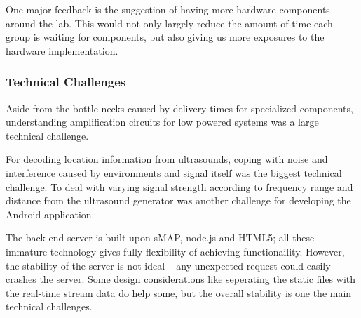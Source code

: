 One major feedback is the suggestion of having more hardware components around the lab. This would not only largely reduce the amount of time each group is waiting for components, but also giving us more exposures to the hardware implementation.

\subsubsection{Technical Challenges}
\label{sec:technical-challenges}
Aside from the bottle necks caused by delivery times for specialized components, understanding amplification circuits for low powered systems was a large technical challenge.

For decoding location information from ultrasounds, coping with noise and interference caused by environments and signal itself was the biggest technical challenge. To deal with varying signal strength according to frequency range and distance from the ultrasound generator was another challenge for developing the Android application.

The back-end server is built upon sMAP, node.js and HTML5; all these immature technology gives fully flexibility of achieving functionaility. However, the stability of the server is not ideal -- any unexpected request could easily crashes the server. Some design considerations like seperating the static files with the real-time stream data do help some, but the overall stability is one the main technical challenges.

